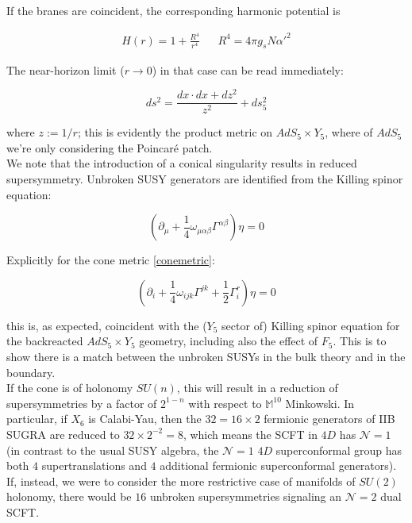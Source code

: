 \documentclass[11pt,a4paper,oneside,openright,titlepage]{book}
\begin{document}
If the branes are coincident, the corresponding harmonic potential is

\begin{align}
 H(r) = 1 + \frac{R^4}{r^4} && R^4 = 4 \pi g_s N \alpha'^2 
\end{align}

The near-horizon limit ($r\rightarrow 0$) in that case can be read immediately:

\begin{equation}
ds^2 = \frac{ dx \cdot dx + dz^2}{z^2} + ds_5^2
\end{equation}

where $z := 1/r$; this is evidently the product metric on $AdS_5 \times Y_5$, where of $AdS_5$ we're only considering the Poincaré patch. \\

We note that the introduction of a conical singularity results in reduced supersymmetry. Unbroken SUSY generators are identified from the Killing spinor equation:

\begin{equation}
	\left(\partial_\mu + \frac{1}{4} \omega_{\mu\alpha\beta} \Gamma^{\alpha\beta} \right) \eta = 0
\end{equation}

Explicitly for the cone metric \ref{conemetric}:

\begin{equation}
	\left(\partial_i + \frac{1}{4} \omega_{ijk} \Gamma^{jk} + \frac{1}{2} \Gamma^r_i \right) \eta = 0
\end{equation}

this is, as expected, coincident with the ($Y_5$ sector of) Killing spinor equation for the backreacted $AdS_5 \times Y_5$ geometry, including also the effect of $F_5$. This is to show there is a match between the unbroken SUSYs in the bulk theory and in the boundary.\\

If the cone is of holonomy $SU(n)$, this will result in a reduction of supersymmetries by a factor of $2^{1-n}$ with respect to $\mathbb{M}^{10}$ Minkowski. In particular, if $X_6$ is Calabi-Yau, then the $32 = 16 \times 2$ fermionic generators of IIB SUGRA are reduced to $32 \times 2^{-2} = 8$, which means the SCFT in $4D$ has $\mathcal{N}=1$ (in contrast to the usual SUSY algebra, the $\mathcal{N}=1$ $4D$ superconformal group has both $4$ supertranslations and $4$ additional fermionic superconformal generators). If, instead, we were to consider the more restrictive case of manifolds of $SU(2)$ holonomy, there would be $16$ unbroken supersymmetries signaling an $\mathcal{N}=2$ dual SCFT.
\end{document}
